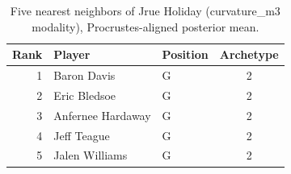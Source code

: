 \begin{table}[htbp]
  \centering\small
  \begin{tabular}{rllc}
    \toprule
    Rank & Player & Position & Archetype \\
    \midrule
    1 & Baron Davis & G & 2 \\
    2 & Eric Bledsoe & G & 2 \\
    3 & Anfernee Hardaway & G & 2 \\
    4 & Jeff Teague & G & 2 \\
    5 & Jalen Williams & G & 2 \\
    \bottomrule
  \end{tabular}
  \caption{Five nearest neighbors of Jrue Holiday (curvature_m3 modality), Procrustes-aligned posterior mean.}
  \label{tab:Jrue_Holiday_neighbors_curvature_m3}
\end{table}

